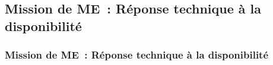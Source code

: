 \subsection{Mission de ME~: Réponse technique à la disponibilité}
\begin{frame}
	\frametitle{Mission de ME~: Réponse technique à la disponibilité}
\end{frame}

